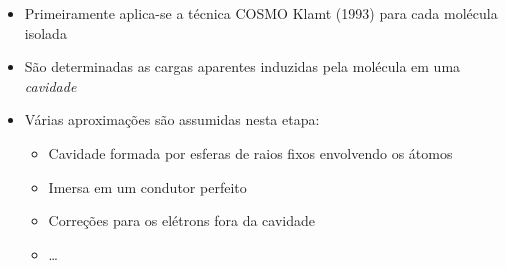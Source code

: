 \documentclass[aspectratio=169]{beamer}
\begin{document}
\begin{frame}
\begin{columns}[c]
		\begin{itemize}
			\item Primeiramente aplica-se a técnica COSMO Klamt (1993) para cada
			molécula isolada
			\item São determinadas as cargas aparentes induzidas pela molécula em uma
			\emph{cavidade} \pause
			\item Várias aproximações são assumidas nesta etapa:
			\begin{itemize}
			\item Cavidade formada por esferas de raios fixos envolvendo os átomos
			\item Imersa em um condutor perfeito
			\item Correções para os elétrons fora da cavidade
			\item \ldots
		\end{itemize}
		\end{itemize}
	\end{columns}
\end{frame}
\end{document}
